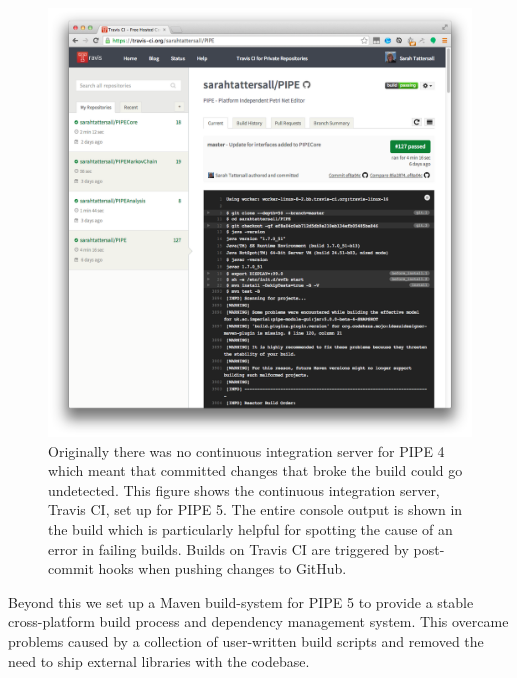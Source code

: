 \begin{figure}[tb]
\begin{center}
    \includegraphics[width=\linewidth]{build/travis_ci.png} 
    \caption{Originally there was no continuous integration server for PIPE 4 which meant that committed changes that broke the build could go undetected. This figure shows the continuous integration server, Travis CI, set up for PIPE 5. The entire console output is shown in the build which is particularly helpful for spotting the cause of an error in failing builds. Builds on Travis CI are triggered by post-commit hooks when pushing changes to GitHub.}
    \label{fig:travis_ci}
\end{center}
\end{figure}

Beyond this we set up a Maven build-system for PIPE 5 to provide a stable cross-platform build process and dependency management system. This overcame problems caused by a collection of user-written build scripts and removed the need to ship external libraries with the codebase.


